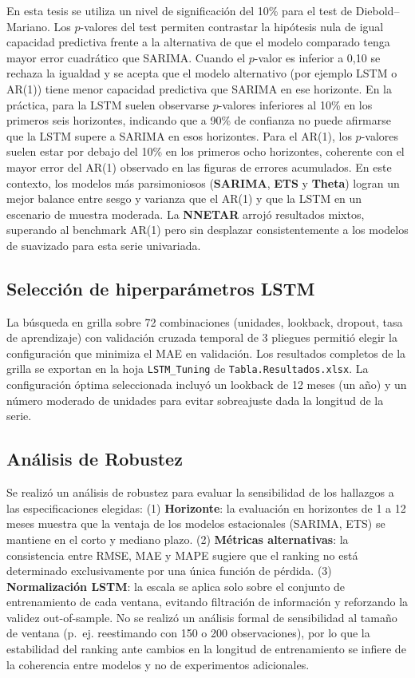 \documentclass[
  12pt, a4paper, oneside]{article}
\begin{document}
En esta tesis se utiliza un nivel de significación del 10\% para el test de Diebold--Mariano. Los \(p\)-valores del test permiten contrastar la hipótesis nula de igual capacidad predictiva frente a la alternativa de que el modelo comparado tenga mayor error cuadrático que SARIMA. Cuando el \(p\)-valor es inferior a 0,10 se rechaza la igualdad y se acepta que el modelo alternativo (por ejemplo LSTM o AR(1)) tiene menor capacidad predictiva que SARIMA en ese horizonte. En la práctica, para la LSTM suelen observarse \(p\)-valores inferiores al 10\% en los primeros seis horizontes, indicando que a 90\% de confianza no puede afirmarse que la LSTM supere a SARIMA en esos horizontes. Para el AR(1), los \(p\)-valores suelen estar por debajo del 10\% en los primeros ocho horizontes, coherente con el mayor error del AR(1) observado en las figuras de errores acumulados. En este contexto, los modelos más parsimoniosos (\textbf{SARIMA}, \textbf{ETS} y \textbf{Theta}) logran un mejor balance entre sesgo y varianza que el AR(1) y que la LSTM en un escenario de muestra moderada. La \textbf{NNETAR} arrojó resultados mixtos, superando al benchmark AR(1) pero sin desplazar consistentemente a los modelos de suavizado para esta serie univariada.

\subsection{Selección de hiperparámetros LSTM}\label{selecciuxf3n-de-hiperparuxe1metros-lstm}

La búsqueda en grilla sobre 72 combinaciones (unidades, lookback, dropout, tasa de aprendizaje) con validación cruzada temporal de 3 pliegues permitió elegir la configuración que minimiza el MAE en validación. Los resultados completos de la grilla se exportan en la hoja \texttt{LSTM\_Tuning} de \texttt{Tabla.Resultados.xlsx}. La configuración óptima seleccionada incluyó un lookback de 12 meses (un año) y un número moderado de unidades para evitar sobreajuste dada la longitud de la serie.

\subsection{Análisis de Robustez}\label{anuxe1lisis-de-robustez}

Se realizó un análisis de robustez para evaluar la sensibilidad de los hallazgos a las especificaciones elegidas: (1) \textbf{Horizonte}: la evaluación en horizontes de 1 a 12 meses muestra que la ventaja de los modelos estacionales (SARIMA, ETS) se mantiene en el corto y mediano plazo. (2) \textbf{Métricas alternativas}: la consistencia entre RMSE, MAE y MAPE sugiere que el ranking no está determinado exclusivamente por una única función de pérdida. (3) \textbf{Normalización LSTM}: la escala se aplica solo sobre el conjunto de entrenamiento de cada ventana, evitando filtración de información y reforzando la validez out-of-sample. No se realizó un análisis formal de sensibilidad al tamaño de ventana (p.~ej. reestimando con 150 o 200 observaciones), por lo que la estabilidad del ranking ante cambios en la longitud de entrenamiento se infiere de la coherencia entre modelos y no de experimentos adicionales.
\end{document}
